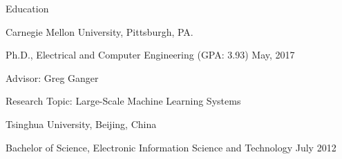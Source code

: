 \documentclass{resume} %
\begin{document}
\begin{rSection}{Education}

\begin{rSubsection}{\hspace{-1em} Carnegie Mellon University, Pittsburgh, PA.}{}{}{}
\vspace{-0.3em}
\item[] \hspace{-2em} Ph.D., Electrical and Computer Engineering (GPA: 3.93) \hfill May, 2017
\item Advisor: Greg Ganger
\item Research Topic: Large-Scale Machine Learning Systems
\end{rSubsection}

\begin{rSubsection}{\hspace{-1em} Tsinghua University, Beijing, China}{}{}{}
\vspace{-0.3em}
\item[] \hspace{-2em} Bachelor of Science, Electronic Information Science and Technology \hfill July 2012
\end{rSubsection}

\end{rSection}
\vspace{-.05in}
\end{document}
